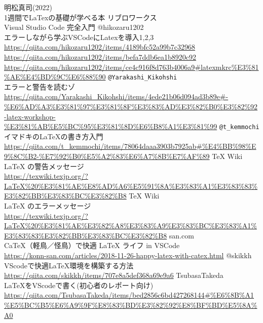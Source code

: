 \documentclass{ltjsarticle}
\begin{document}
\begin{thebibliography}{999}
  明松真司(2022)\\
  1週間でLaTexの基礎が学べる本
  リブロワークス\\
  Visual Studio Code 完全入門
  @hikozaru1202\\
  エラーしながら学ぶVSCodeにLatexを導入1,2,3\\
  \url{https://qiita.com/hikozaru1202/items/4189bfc52a99b7c32968}\\
  \url{https://qiita.com/hikozaru1202/items/befa7ddb6ea1b8920c92}\\
  \url{https://qiita.com/hikozaru1202/items/ce4c916f8d763b4006a9#latexmkrc%E3%81%AE%E4%BD%9C%E6%88%90}
  \verb|@Yarakashi_Kikohshi|\\
  エラーと警告を読むゾ\\
  \url{https://qiita.com/Yarakashi_Kikohshi/items/4ede21b06d094ad3b89e#-%E6%AD%A3%E3%81%97%E3%81%8F%E3%83%AD%E3%82%B0%E3%82%92-latex-workshop-%E3%81%AB%E5%BC%95%E3%81%8D%E6%B8%A1%E3%81%99}
  \verb|@t_kemmochi|\\
  イマドキのLaTeXの書き方入門\\
  \url{https://qiita.com/t_kemmochi/items/78064daaa3903b7925ab#%E4%BB%98%E9%8C%B2-%E7%92%B0%E5%A2%83%E6%A7%8B%E7%AF%89}
  TeX Wiki\\
  LaTeX の警告メッセージ\\
  \url{https://texwiki.texjp.org/?LaTeX%20%E3%81%AE%E8%AD%A6%E5%91%8A%E3%83%A1%E3%83%83%E3%82%BB%E3%83%BC%E3%82%B8}
  TeX Wiki\\
  LaTeX のエラーメッセージ\\
  \url{https://texwiki.texjp.org/?LaTeX%20%E3%81%AE%E3%82%A8%E3%83%A9%E3%83%BC%E3%83%A1%E3%83%83%E3%82%BB%E3%83%BC%E3%82%B8}
  san.com\\
  CaTeX（軽鳥／怪鳥）で快適 LaTeX ライフ in VSCode\\
  \url{https://konn-san.com/articles/2018-11-26-happy-latex-with-catex.html}
  @skikkh\\
  VScodeで快適LaTeX環境を構築する方法\\
  \url{https://qiita.com/skikkh/items/707e8a5def368a69e9a6}
  TsubasaTakeda\\
  LaTeXをVScodeで書く(初心者のレポート向け)\\
  \url{https://qiita.com/TsubasaTakeda/items/bed2856c6bd427268144#%E6%8B%A1%E5%BC%B5%E6%A9%9F%E8%83%BD%E3%82%92%E8%BF%BD%E5%8A%A0}

\end{thebibliography}
\end{document}
